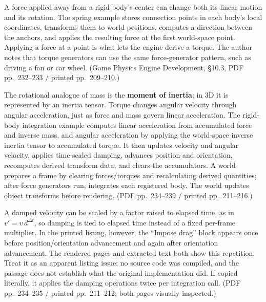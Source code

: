 \hypertarget{06-engine-ii-ch033-advance-rotation-with-torque-then-check-the-exact-integration-listing}{}

A force applied away from a rigid body's center can change both its linear motion and its rotation. The spring example stores connection points in each body's local coordinates, transforms them to world positions, computes a direction between the anchors, and applies the resulting force at the first world-space point. Applying a force at a point is what lets the engine derive a torque. The author notes that torque generators can use the same force-generator pattern, such as driving a fan or car wheel. (Game Physics Engine Development, §10.3, PDF pp.~232--233 / printed pp.~209--210.)

The rotational analogue of mass is the \textbf{moment of inertia}; in 3D it is represented by an inertia tensor. Torque changes angular velocity through angular acceleration, just as force and mass govern linear acceleration. The rigid-body integration example computes linear acceleration from accumulated force and inverse mass, and angular acceleration by applying the world-space inverse inertia tensor to accumulated torque. It then updates velocity and angular velocity, applies time-scaled damping, advances position and orientation, recomputes derived transform data, and clears the accumulators. A world prepares a frame by clearing forces/torques and recalculating derived quantities; after force generators run,  integrates each registered body. The world updates object transforms before rendering. (PDF pp.~234--239 / printed pp.~211--216.)

A damped velocity can be scaled by a factor raised to elapsed time, as in \(v' = v\,d^{\Delta t}\), so damping is tied to elapsed time instead of a fixed per-frame multiplier. In the printed  listing, however, the ``Impose drag'' block appears once before position/orientation advancement and again after orientation advancement. The rendered pages and extracted text both show this repetition. Treat it as an apparent listing issue; no source code was compiled, and the passage does not establish what the original implementation did. If copied literally, it applies the damping operations twice per integration call. (PDF pp.~234--235 / printed pp.~211--212; both pages visually inspected.)

